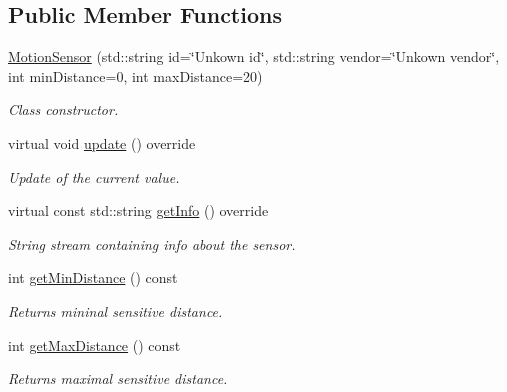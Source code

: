 \subsection*{Public Member Functions}
\begin{DoxyCompactItemize}
\item 
\hyperlink{classMotionSensor_a993abd23e077285aefbda869d8c26aea}{Motion\+Sensor} (std\+::string id=\char`\"{}Unkown id\char`\"{}, std\+::string vendor=\char`\"{}Unkown vendor\char`\"{}, int min\+Distance=0, int max\+Distance=20)
\begin{DoxyCompactList}\small\item\em Class constructor. \end{DoxyCompactList}\item 
virtual void \hyperlink{classMotionSensor_a8e71f20dc63f45669377e6efc4d7c6df}{update} () override
\begin{DoxyCompactList}\small\item\em Update of the current value. \end{DoxyCompactList}\item 
virtual const std\+::string \hyperlink{classMotionSensor_a800b65765d7d5064b6b06d9c4e8c5bf2}{get\+Info} () override\hypertarget{classMotionSensor_a800b65765d7d5064b6b06d9c4e8c5bf2}{}\label{classMotionSensor_a800b65765d7d5064b6b06d9c4e8c5bf2}

\begin{DoxyCompactList}\small\item\em String stream containing info about the sensor. \end{DoxyCompactList}\item 
int \hyperlink{classMotionSensor_aa19bf311e57fc21276d2eb74190cb709}{get\+Min\+Distance} () const \hypertarget{classMotionSensor_aa19bf311e57fc21276d2eb74190cb709}{}\label{classMotionSensor_aa19bf311e57fc21276d2eb74190cb709}

\begin{DoxyCompactList}\small\item\em Returns mininal sensitive distance. \end{DoxyCompactList}\item 
int \hyperlink{classMotionSensor_af095104075a3e5cb7c6c6466c8813f26}{get\+Max\+Distance} () const \hypertarget{classMotionSensor_af095104075a3e5cb7c6c6466c8813f26}{}\label{classMotionSensor_af095104075a3e5cb7c6c6466c8813f26}

\begin{DoxyCompactList}\small\item\em Returns maximal sensitive distance. \end{DoxyCompactList}\end{DoxyCompactItemize}
